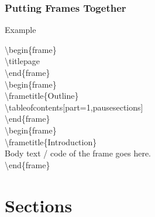 \documentclass[aspectratio=169,utf8]{ctexbeamer}
\begin{document}
\begin{frame}
  \frametitle{Putting Frames Together}

  \begin{block}{Example}
    \tt \scriptsize

\textbackslash{}begin\{frame\}\\
\alert{\textbackslash{}titlepage}\\
\textbackslash{}end\{frame\}\\

\textbackslash{}begin\{frame\}\\
\alert{
\textbackslash{}frametitle\{Outline\}\\
\textbackslash{}tableofcontents[part=1,pausesections]
}\\
\textbackslash{}end\{frame\}\\

\textbackslash{}begin\{frame\}\\
\alert{\textbackslash{}frametitle\{Introduction\}}\\
Body text / code of the frame goes here.\\
\textbackslash{}end\{frame\}
    
  \end{block}
\end{frame}


\section{Sections}
\end{document}
